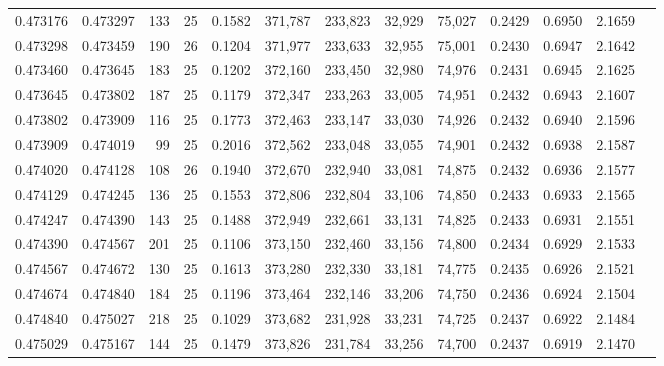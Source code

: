 \begin{tabular}{rrrrrrrrrrrrr}
0.473176 & 0.473297 &   133 &  25 &                                     0.1582 & 371,787 & 233,823 &  32,929 &  75,027 & 0.2429 & 0.6950 & 2.1659 \\
0.473298 & 0.473459 &   190 &  26 &                                     0.1204 & 371,977 & 233,633 &  32,955 &  75,001 & 0.2430 & 0.6947 & 2.1642 \\
0.473460 & 0.473645 &   183 &  25 &                                     0.1202 & 372,160 & 233,450 &  32,980 &  74,976 & 0.2431 & 0.6945 & 2.1625 \\
0.473645 & 0.473802 &   187 &  25 &                                     0.1179 & 372,347 & 233,263 &  33,005 &  74,951 & 0.2432 & 0.6943 & 2.1607 \\
0.473802 & 0.473909 &   116 &  25 &                                     0.1773 & 372,463 & 233,147 &  33,030 &  74,926 & 0.2432 & 0.6940 & 2.1596 \\
0.473909 & 0.474019 &    99 &  25 &                                     0.2016 & 372,562 & 233,048 &  33,055 &  74,901 & 0.2432 & 0.6938 & 2.1587 \\
0.474020 & 0.474128 &   108 &  26 &                                     0.1940 & 372,670 & 232,940 &  33,081 &  74,875 & 0.2432 & 0.6936 & 2.1577 \\
0.474129 & 0.474245 &   136 &  25 &                                     0.1553 & 372,806 & 232,804 &  33,106 &  74,850 & 0.2433 & 0.6933 & 2.1565 \\
0.474247 & 0.474390 &   143 &  25 &                                     0.1488 & 372,949 & 232,661 &  33,131 &  74,825 & 0.2433 & 0.6931 & 2.1551 \\
0.474390 & 0.474567 &   201 &  25 &                                     0.1106 & 373,150 & 232,460 &  33,156 &  74,800 & 0.2434 & 0.6929 & 2.1533 \\
0.474567 & 0.474672 &   130 &  25 &                                     0.1613 & 373,280 & 232,330 &  33,181 &  74,775 & 0.2435 & 0.6926 & 2.1521 \\
0.474674 & 0.474840 &   184 &  25 &                                     0.1196 & 373,464 & 232,146 &  33,206 &  74,750 & 0.2436 & 0.6924 & 2.1504 \\
0.474840 & 0.475027 &   218 &  25 &                                     0.1029 & 373,682 & 231,928 &  33,231 &  74,725 & 0.2437 & 0.6922 & 2.1484 \\
0.475029 & 0.475167 &   144 &  25 &                                     0.1479 & 373,826 & 231,784 &  33,256 &  74,700 & 0.2437 & 0.6919 & 2.1470 \\

\end{tabular}
